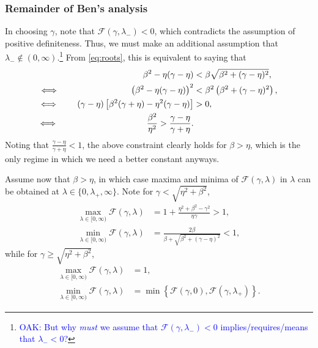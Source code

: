 \documentclass[a4paper,10pt]{article}
\newcommand{\tcb}{\textcolor{blue}}
\begin{document}
\subsubsection{Remainder of Ben's analysis}
In choosing $\gamma$, note that $\mathcal{F}(\gamma,\lambda_-) < 0$, which contradicts
the assumption of positive definiteness. Thus, we must make an additional assumption
that $\lambda_-\not\in(0,\infty)$.\footnote{\tcb{OAK: But why \textit{must} we assume that $\mathcal{F}(\gamma,\lambda_-) < 0$ implies/requires/means that $\lambda_- < 0$?}} From \eqref{eq:roots}, this is equivalent to saying that
%
\begin{align*}
\beta^2-\eta(\gamma-\eta) & < \beta\sqrt{\beta^2+(\gamma-\eta)^2}, \\
\Longleftrightarrow\hspace{19.5ex}
\left(\beta^2-\eta(\gamma-\eta)\right)^2& < \beta^2\left(\beta^2+(\gamma-\eta)^2\right), \\
\Longleftrightarrow\hspace{5ex}
(\gamma-\eta)\left[\beta^2(\gamma+\eta) - \eta^2(\gamma-\eta)\right] & > 0, \\
\Longleftrightarrow\hspace{24ex}
\frac{\beta^2}{\eta^2} > \frac{\gamma-\eta}{\gamma+\eta}.
\end{align*}
%
Noting that $\tfrac{\gamma-\eta}{\gamma+\eta} < 1$, the above constraint clearly holds
for $\beta > \eta$, which is the only regime in which we need a better constant anyways.

Assume now that $\beta > \eta$, in which case maxima and minima of
$\mathcal{F}(\gamma,\lambda)$ in $\lambda$ can be obtained at
$\lambda\in\{0,\lambda_+,\infty\}$. Note for $\gamma < \sqrt{\eta^2+\beta^2}$,
%
\begin{align*}
\max_{\lambda\in[0,\infty)} \mathcal{F}(\gamma,\lambda) & =
	1 + \frac{\eta^2+\beta^2 - \gamma^2}{\eta\gamma} > 1, \\
\min_{\lambda\in[0,\infty)} \mathcal{F}(\gamma,\lambda) & =
	\frac{2\beta}{\beta + \sqrt{\beta^2 + (\gamma-\eta)^2}} < 1,
\end{align*}
%
while for $\gamma \geq \sqrt{\eta^2+\beta^2}$,
%
\begin{align*}
\max_{\lambda\in[0,\infty)} \mathcal{F}(\gamma,\lambda) & = 1, \\
\min_{\lambda\in[0,\infty)} \mathcal{F}(\gamma,\lambda) & =
	\min\left\{\mathcal{F}(\gamma,0),\mathcal{F}(\gamma,\lambda_+)\right\}.
\end{align*}
%
\end{document}
